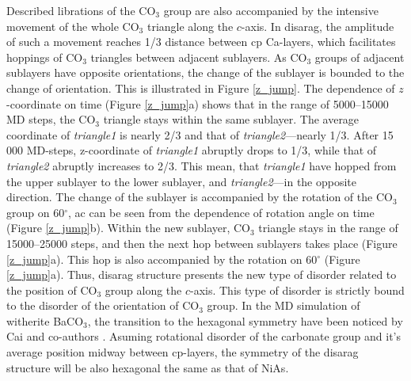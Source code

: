 \documentclass[journal=jacsat,manuscript=article]{achemso}
\begin{document}
Described librations of the CO$_3$ group are also accompanied by the intensive movement of the whole CO$_3$ triangle along the $c$-axis. 
In disarag, the amplitude of such a movement reaches 1/3 distance between cp Ca-layers, which facilitates hoppings of CO$_3$ triangles between adjacent sublayers.
As CO$_3$ groups of adjacent sublayers have opposite orientations, the change of the sublayer is bounded to the change of orientation.
This is illustrated in Figure \ref{z_jump}.
The dependence of $z$-coordinate on time (Figure \ref{z_jump}a)  shows that in the range of 5000--15000 MD steps, the CO$_3$ triangle stays within the same sublayer.
The average coordinate of {\it triangle1} is nearly 2/3 and that of {\it triangle2}---nearly 1/3.
After 15 000 MD-steps, z-coordinate of {\it triangle1} abruptly drops to 1/3, while that of {\it triangle2} abruptly increases to 2/3.
This mean, that {\it triangle1} have hopped from the upper sublayer to the lower sublayer, and {\it triangle2}---in the opposite direction.
The change of the sublayer is accompanied by the rotation of the CO$_3$ group on 60$^{\circ}$, ac can be seen from the dependence of rotation angle on time (Figure \ref{z_jump}b). 
Within the new sublayer, CO$_3$ triangle stays in the range of 15000--25000 steps, and then the next hop between sublayers takes place (Figure \ref{z_jump}a).
This hop is also accompanied by the rotation on 60$^{\circ}$ (Figure \ref{z_jump}a).
Thus, disarag structure presents the new type of disorder related to the position of CO$_3$ group along the $c$-axis. 
This type of disorder is strictly bound to the disorder of the orientation of CO$_3$ group.
In the MD simulation of witherite BaCO$_3$, the transition to the hexagonal symmetry have been noticed by Cai and co-authors \cite{cai2020}.
Asuming rotational disorder of the carbonate group and it's average position midway between cp-layers, the symmetry of the disarag structure will be also hexagonal the same as that of NiAs.
\end{document}
